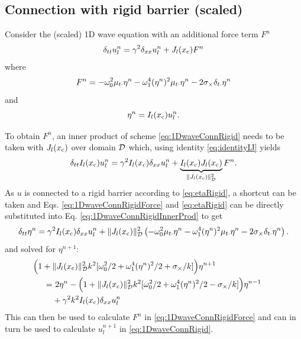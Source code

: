 \subsection{Connection with rigid barrier (scaled)}
Consider the (scaled) 1D wave equation with an additional force term $F^n$
\begin{equation}\label{eq:1DwaveConnRigid}
    \delta_{tt} u_l^n = \gamma^2\delta_{xx} u_l^n + J_l(x_{\text{c}})F^n
\end{equation}
where
\begin{equation}\label{eq:1DwaveConnRigidForce}
    F^n = -\omega_0^2\mu_{t\cdot}\eta^n - \omega_1^4(\eta^n)^2\mu_{t\cdot}\eta^n - 2\sigma_\times \delta_{t\cdot} \eta^n
\end{equation}
and
\begin{equation}\label{eq:etaRigid}
    \eta^n = I_l(x_{\text{c}})u_l^n.
\end{equation}

To obtain $F^n$, an inner product of scheme \eqref{eq:1DwaveConnRigid} needs to be taken with $J_l(x_{\text{c}})$ over domain $\mathcal{D}$ which, using identity \eqref{eq:identityIJ} yields 
\begin{equation}\label{eq:1DwaveConnRigidInnerProd}
    \delta_{tt} I_l(x_{\text{c}})u_l^n = \gamma^2 I_l(x_{\text{c}})\delta_{xx} u_l^n + \underbrace{I_l(x_{\text{c}})J_l(x_{\text{c}})}_{\lVert J_l(x_{\text{c}}) \rVert^2_{\mathcal{D}}}F^n.
\end{equation}
As $u$ is connected to a rigid barrier according to \eqref{eq:etaRigid}, a shortcut can be taken and Eqs. \eqref{eq:1DwaveConnRigidForce} and \eqref{eq:etaRigid} can be directly substituted into Eq. \eqref{eq:1DwaveConnRigidInnerProd} to get
\begin{equation}
    \delta_{tt} \eta^n = \gamma^2 I_l(x_{\text{c}})\delta_{xx} u_l^n + \lVert J_l(x_{\text{c}})\rVert^2_{\mathcal{D}}\left( -\omega_0^2\mu_{t\cdot}\eta^n - \omega_1^4(\eta^n)^2\mu_{t\cdot}\eta^n - 2\sigma_\times \delta_{t\cdot} \eta^n\right).
\end{equation}
and solved for $\eta^{n+1}$:
\begin{equation}
    \begin{aligned}
    &\!\!\!\!\!\!\!\!\!\!\!\!\!\!\Big(1 + \lVert J_l(x_\ctxt)\rVert^2_\D k^2[\omega_0^2/2 + \omega_1^4(\eta^n)^2/2 + \sigma_\times/k] \Big)\eta^{n+1} \\
   = &\ 2 \eta^n - \Big(1 + \lVert J_l(x_\ctxt)\rVert^2_\D k^2[\omega_0^2/2 + \omega_1^4(\eta^n)^2/2 - \sigma_\times/k]\Big)
    \eta^{n-1}\\
    &+ \gamma^2k^2 I_l(x_\ctxt)\dxx\uln
    \end{aligned}
\end{equation}
This can then be used to calculate $F^n$ in \eqref{eq:1DwaveConnRigidForce} and can in turn be used to calculate $u_l^{n+1}$ in \eqref{eq:1DwaveConnRigid}.

